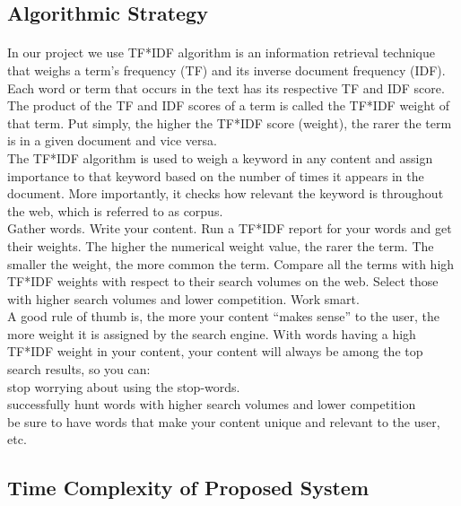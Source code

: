 \newpage
\subsection{Algorithmic Strategy}
\paragraph{} In our project we use TF*IDF algorithm is an information retrieval technique that weighs a term’s frequency (TF) and its inverse document frequency (IDF). Each word or term that occurs in the text has its respective TF and IDF score.\\
The product of the TF and IDF scores of a term is called the TF*IDF weight of that term. Put simply, the higher the TF*IDF score (weight), the rarer the term is in a given document and vice versa.\\
The TF*IDF algorithm is used to weigh a keyword in any content and assign importance to that keyword based on the number of times it appears in the document. More importantly, it checks how relevant the keyword is throughout the web, which is referred to as corpus.\\

Gather words. Write your content. Run a TF*IDF report for your words and get their weights. The higher the numerical weight value, the rarer the term. The smaller the weight, the more common the term. Compare all the terms with high TF*IDF weights with respect to their search volumes on the web. Select those with higher search volumes and lower competition. Work smart.\\

A good rule of thumb is, the more your content “makes sense” to the user, the more weight it is assigned by the search engine. With words having a high TF*IDF weight in your content, your content will always be among the top search results, so you can:\\

stop worrying about using the stop-words.\\
successfully hunt words with higher search volumes and lower competition\\
be sure to have words that make your content unique and relevant to the user, etc.



\subsection{Time Complexity of Proposed System}
